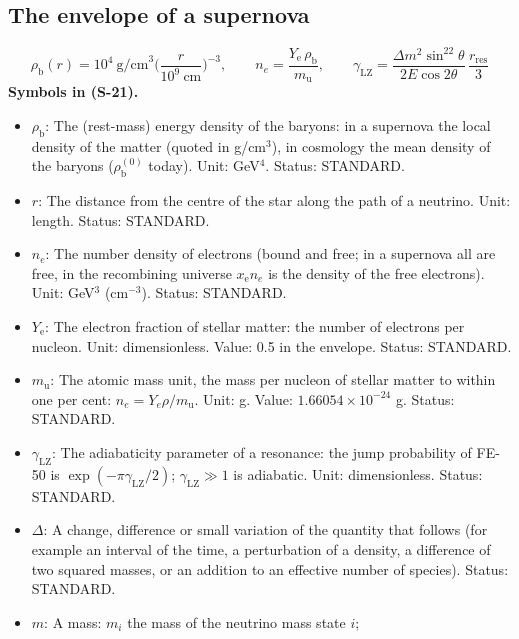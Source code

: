 \documentclass[
  10pt,
]{article}
\providecommand{\tightlist}{%
  \setlength{\itemsep}{0pt}\setlength{\parskip}{0pt}}
\begin{document}
\hypertarget{the-envelope-of-a-supernova}{%
\subsection{The envelope of a
supernova}\label{the-envelope-of-a-supernova}}

\[
\rho_{\mathrm{b}}(r) = 10^4\ \text{g/cm}^3\Big(\frac{r}{10^9\ \text{cm}}\Big)^{-3},\qquad n_e = \frac{Y_{\mathrm{e}}\,\rho_{\mathrm{b}}}{m_{\mathrm{u}}},\qquad
\gamma_{\mathrm{LZ}} = \frac{\Delta m^2\sin^22\theta}{2E\cos2\theta}\,\frac{r_{\mathrm{res}}}{3} \tag{S-21}
\] \textbf{Symbols in (S-21).}

\begin{itemize}
\tightlist
\item
  \(\rho_{\mathrm{b}}\): The (rest-mass) energy density of the baryons:
  in a supernova the local density of the matter (quoted in g/cm\(^3\)),
  in cosmology the mean density of the baryons
  (\(\rho_{\mathrm{b}}^{(0)}\) today). Unit: GeV\(^4\). Status:
  STANDARD.
\item
  \(r\): The distance from the centre of the star along the path of a
  neutrino. Unit: length. Status: STANDARD.
\item
  \(n_e\): The number density of electrons (bound and free; in a
  supernova all are free, in the recombining universe
  \(x_{\mathrm{e}}n_e\) is the density of the free electrons). Unit:
  GeV\(^3\) (cm\(^{-3}\)). Status: STANDARD.
\item
  \(Y_{\mathrm{e}}\): The electron fraction of stellar matter: the
  number of electrons per nucleon. Unit: dimensionless. Value: 0.5 in
  the envelope. Status: STANDARD.
\item
  \(m_{\mathrm{u}}\): The atomic mass unit, the mass per nucleon of
  stellar matter to within one per cent:
  \(n_e = Y_e\rho/m_{\mathrm{u}}\). Unit: g. Value:
  \(1.66054\times10^{-24}\) g. Status: STANDARD.
\item
  \(\gamma_{\mathrm{LZ}}\): The adiabaticity parameter of a resonance:
  the jump probability of FE-50 is \(\exp(-\pi\gamma_{\mathrm{LZ}}/2)\);
  \(\gamma_{\mathrm{LZ}} \gg 1\) is adiabatic. Unit: dimensionless.
  Status: STANDARD.
\item
  \(\Delta\): A change, difference or small variation of the quantity
  that follows (for example an interval of the time, a perturbation of a
  density, a difference of two squared masses, or an addition to an
  effective number of species). Status: STANDARD.
\item
  \(m\): A mass: \(m_i\) the mass of the neutrino mass state \(i\);

\end{itemize}
\end{document}
